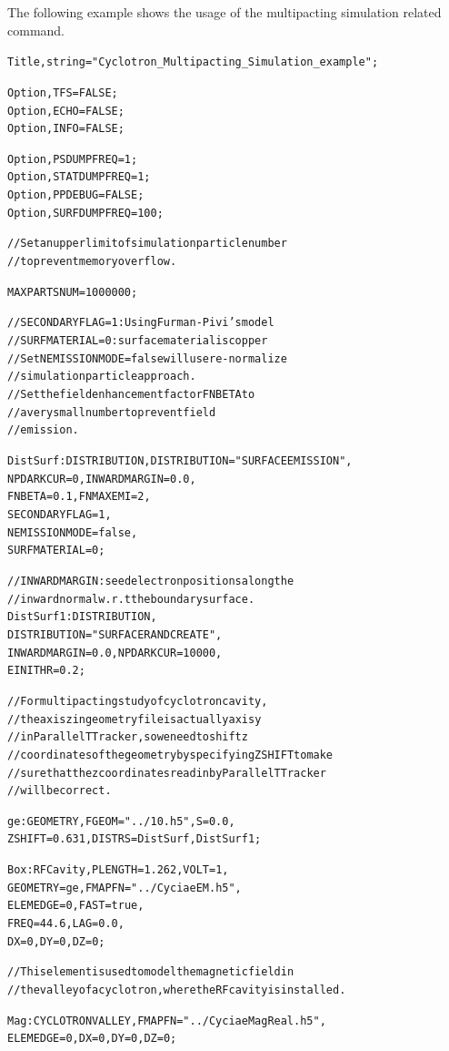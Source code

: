 The following example shows the usage of the multipacting simulation related command.\\
\begin{alltt}
Title, string="Cyclotron_Multipacting_Simulation_example";

Option, TFS=FALSE;
Option, ECHO=FALSE;
Option, INFO=FALSE;

Option, PSDUMPFREQ=1;
Option, STATDUMPFREQ=1;
Option, PPDEBUG=FALSE;
Option, SURFDUMPFREQ=100;

// Set an upper limit of simulation particle number 
// to prevent memory overflow. 

MAXPARTSNUM=1000000;

// SECONDARYFLAG = 1: Using Furman-Pivi's model
// SURFMATERIAL=0: surface material is copper 
// Set NEMISSIONMODE=false will use re-normalize 
// simulation particle approach. 
// Set the field enhancement factor FNBETA to 
// a very small number to prevent field 
// emission.

DistSurf: DISTRIBUTION, DISTRIBUTION = "SURFACEEMISSION", 
                        NPDARKCUR =0,INWARDMARGIN = 0.0, 
                        FNBETA = 0.1, FNMAXEMI = 2,  
                        SECONDARYFLAG = 1, 
                        NEMISSIONMODE=false, 
                        SURFMATERIAL=0; 

// INWARDMARGIN: seed electron positions along the 
// inward normal w.r.t the boundary surface.
DistSurf1: DISTRIBUTION, 
           DISTRIBUTION = "SURFACERANDCREATE",
           INWARDMARGIN = 0.0, NPDARKCUR =10000, 
           EINITHR = 0.2; 

// For multipacting study of cyclotron cavity, 
// the axis z in geometry file is actually axis y 
// in ParallelTTracker, so we need to shift z 
// coordinates of the geometry by specifying ZSHIFT to make 
// sure that the z coordinates read in by ParallelTTracker 
// will be correct.
						    
ge: GEOMETRY, FGEOM="../10.h5", S=0.0, 
       ZSHIFT=0.631, DISTRS={DistSurf, DistSurf1};

Box: RFCavity, PLENGTH = 1.262, VOLT = 1, 
               GEOMETRY = ge, FMAPFN = "../CyciaeEM.h5",
	       ELEMEDGE =0, FAST=true, 
               FREQ =44.6, LAG = 0.0, 
               DX = 0, DY = 0, DZ = 0;

// This element is used to model the magnetic field in 
// the valley of a cyclotron, where the RF cavity is installed.
 
Mag: CYCLOTRONVALLEY, FMAPFN = "../CyciaeMagReal.h5", 
                      ELEMEDGE =0,DX = 0, DY = 0, DZ = 0;


\end{alltt}
